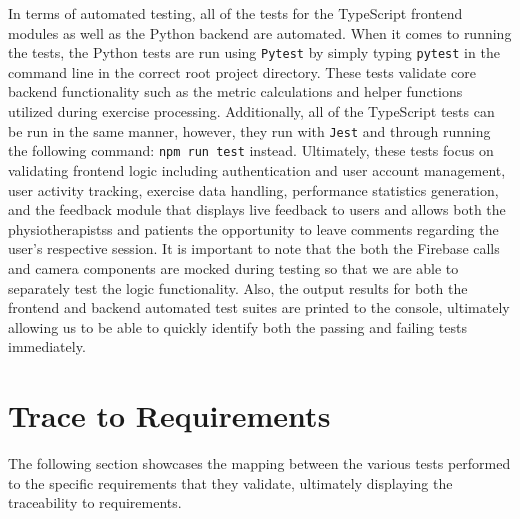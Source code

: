 \documentclass[12pt, titlepage]{article}
\begin{document}
In terms of automated testing, all of the tests for the TypeScript frontend modules as well as the Python backend 
are automated. When it comes to running the tests, the Python tests are run using \texttt{Pytest} by simply typing \texttt{pytest} in the command line in the correct 
root project directory. These tests validate core backend functionality such as the metric calculations and helper 
functions utilized during exercise processing. Additionally, all of the TypeScript tests can be run in the same manner, however, they run 
with \texttt{Jest} and through running the following command: \texttt{npm run test} instead. Ultimately, these tests focus on validating frontend logic including authentication and user account
 management, user activity tracking, exercise data handling, performance statistics generation, and the feedback 
 module that displays live feedback to users and allows both the physiotherapistss and patients the opportunity 
 to leave comments regarding the user's respective session. It is important to note that the both the Firebase calls and 
 camera components are mocked during testing so that we are able to separately test the logic functionality. 
 Also, the output results for both the frontend and backend automated test suites are printed to the console, ultimately 
 allowing us to be able to quickly identify both the passing and failing tests immediately.
		
\section{Trace to Requirements}

The following section showcases the mapping between the various tests performed to the specific requirements that 
they validate, ultimately displaying the traceability to requirements.
\end{document}
